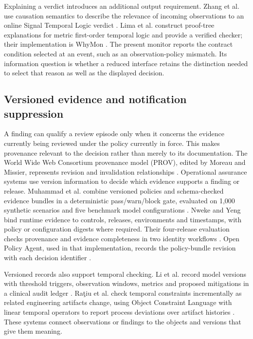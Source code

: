 \documentclass[preprint,11pt]{elsarticle}
\begin{document}
Explaining a verdict introduces an additional output requirement. Zhang et al. use causation semantics to describe the relevance of incoming observations to an online Signal Temporal Logic verdict \cite{zhang2026caumon}. Lima et al. construct proof-tree explanations for metric first-order temporal logic and provide a verified checker; their implementation is WhyMon \cite{lima2024explainable}. The present monitor reports the contract condition selected at an event, such as an observation-policy mismatch. Its information question is whether a reduced interface retains the distinction needed to select that reason as well as the displayed decision.

\subsection{Versioned evidence and notification suppression}
A finding can qualify a review episode only when it concerns the evidence currently being reviewed under the policy currently in force. This makes provenance relevant to the decision rather than merely to its documentation. The World Wide Web Consortium provenance model (PROV), edited by Moreau and Missier, represents revision and invalidation relationships \cite{moreau2013prov}. Operational assurance systems use version information to decide which evidence supports a finding or release. Muhammad et al. combine versioned policies and schema-checked evidence bundles in a deterministic pass/warn/block gate, evaluated on 1,000 synthetic scenarios and five benchmark model configurations \cite{muhammad2026audit}. Nweke and Yeng bind runtime evidence to controls, releases, environments and timestamps, with policy or configuration digests where required. Their four-release evaluation checks provenance and evidence completeness in two identity workflows \cite{nwekeyeng2026compliance}. Open Policy Agent, used in that implementation, records the policy-bundle revision with each decision identifier \cite{opa2026logs}.

Versioned records also support temporal checking. Li et al. record model versions with threshold triggers, observation windows, metrics and proposed mitigations in a clinical audit ledger \cite{li2026sentinel}. Ra\c{t}iu et al. check temporal constraints incrementally as related engineering artifacts change, using Object Constraint Language with linear temporal operators to report process deviations over artifact histories \cite{ratiu2026runtime}. These systems connect observations or findings to the objects and versions that give them meaning.
\end{document}
